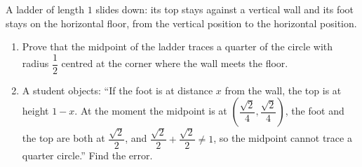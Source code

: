 A ladder of length $1$ slides down: its top stays against a vertical wall and its foot stays on the horizontal floor, from the vertical position to the horizontal position.
\begin{enumerate}
\item[(a)] Prove that the midpoint of the ladder traces a quarter of the circle with radius $\dfrac{1}{2}$ centred at the corner where the wall meets the floor.
\item[(b)] A student objects: ``If the foot is at distance $x$ from the wall, the top is at height $1-x$. At the moment the midpoint is at $\left(\dfrac{\sqrt2}{4},\dfrac{\sqrt2}{4}\right)$, the foot and the top are both at $\dfrac{\sqrt2}{2}$, and $\dfrac{\sqrt2}{2}+\dfrac{\sqrt2}{2}\ne1$, so the midpoint cannot trace a quarter circle.'' Find the error.
\end{enumerate}
